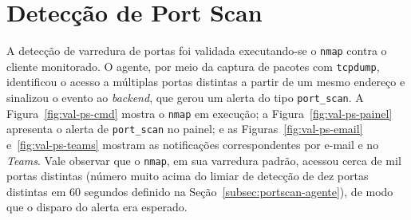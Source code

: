 \documentclass[
    12pt
    ,oneside
    ,a4paper
    ,chapter=TITLE
    ,section=TITLE
    ,sumario=abnt-6027-2012]{abntex2}
\begin{document}
\begin{figure}[H]
\end{figure}

\begin{figure}[H]
\end{figure}

\section{Detecção de Port Scan}
\label{sec:valid-portscan}

A detecção de varredura de portas foi validada executando-se o \texttt{nmap} contra o cliente monitorado. O agente, por meio da captura de pacotes com \texttt{tcpdump}, identificou o acesso a múltiplas portas distintas a partir de um mesmo endereço e sinalizou o evento ao \textit{backend}, que gerou um alerta do tipo \texttt{port\_scan}. A Figura~\ref{fig:val-ps-cmd} mostra o \texttt{nmap} em execução; a Figura~\ref{fig:val-ps-painel} apresenta o alerta de \texttt{port\_scan} no painel; e as Figuras~\ref{fig:val-ps-email} e~\ref{fig:val-ps-teams} mostram as notificações correspondentes por e-mail e no \textit{Teams}. Vale observar que o \texttt{nmap}, em sua varredura padrão, acessou cerca de mil portas distintas (número muito acima do limiar de detecção de dez portas distintas em 60 segundos definido na Seção~\ref{subsec:portscan-agente}), de modo que o disparo do alerta era esperado.

\begin{figure}[H]
\end{figure}

\begin{figure}[H]
\end{figure}

\begin{figure}[H]
\end{figure}
\end{document}
